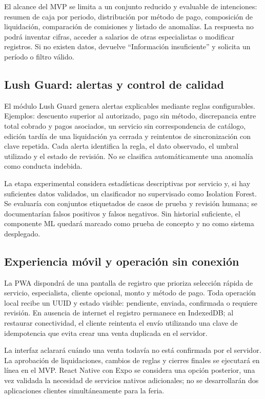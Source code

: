 El alcance del MVP se limita a un conjunto reducido y evaluable de intenciones: resumen de caja por periodo, distribución por método de pago, composición de liquidación, comparación de comisiones y listado de anomalías. La respuesta no podrá inventar cifras, acceder a salarios de otras especialistas o modificar registros. Si no existen datos, devuelve “Información insuficiente” y solicita un período o filtro válido.


\subsection{Lush Guard: alertas y control de calidad}

El módulo Lush Guard genera alertas explicables mediante reglas configurables. Ejemplos: descuento superior al autorizado, pago sin método, discrepancia entre total cobrado y pagos asociados, un servicio sin correspondencia de catálogo, edición tardía de una liquidación ya cerrada y reintentos de sincronización con clave repetida. Cada alerta identifica la regla, el dato observado, el umbral utilizado y el estado de revisión. No se clasifica automáticamente una anomalía como conducta indebida.


La etapa experimental considera estadísticas descriptivas por servicio y, si hay suficientes datos validados, un clasificador no supervisado como Isolation Forest. Se evaluaría con conjuntos etiquetados de casos de prueba y revisión humana; se documentarían falsos positivos y falsos negativos. Sin historial suficiente, el componente ML quedará marcado como prueba de concepto y no como sistema desplegado.


\subsection{Experiencia móvil y operación sin conexión}

La PWA dispondrá de una pantalla de registro que prioriza selección rápida de servicio, especialista, cliente opcional, monto y método de pago. Toda operación local recibe un UUID y estado visible: pendiente, enviada, confirmada o requiere revisión. En ausencia de internet el registro permanece en IndexedDB; al restaurar conectividad, el cliente reintenta el envío utilizando una clave de idempotencia que evita crear una venta duplicada en el servidor.


La interfaz aclarará cuándo una venta todavía no está confirmada por el servidor. La aprobación de liquidaciones, cambios de reglas y cierres finales se ejecutará en línea en el MVP. React Native con Expo se considera una opción posterior, una vez validada la necesidad de servicios nativos adicionales; no se desarrollarán dos aplicaciones clientes simultáneamente para la feria.


